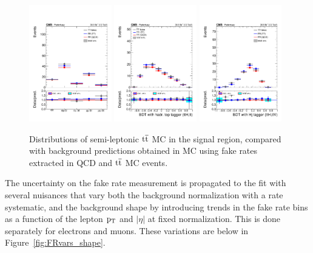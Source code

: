 \begin{figure}[htb]
        \centering 
        \includegraphics[width=0.32\textwidth]{ch10_figs/2lep_catIndex_nosign.pdf}
        \includegraphics[width=0.32\textwidth]{ch10_figs/kinMVA_2lss_ttbar_withBDTv8.pdf}
        \includegraphics[width=0.32\textwidth]{ch10_figs/kinMVA_2lss_ttV_withHj.pdf}
        \caption[MC validation plots of FR method]{Distributions of semi-leptonic $\mathrm{t}\overline{\mathrm{t}}$ MC in the signal region, compared with background predictions obtained
          in MC using fake rates extracted in QCD and $\mathrm{t}\overline{\mathrm{t}}$ MC events.}
        \label{fig:closure}
\end{figure}

\noindent The uncertainty on the fake rate measurement is propagated to the fit with several nuisances that vary both
the background normalization with a rate systematic, and the background shape by introducing trends
in the fake rate bins as a function of the lepton $\mathrm{p}_{\mathrm{T}}$ and $|\eta|$  at fixed normalization.
This is done separately for electrons and muons. These variations are below in Figure~\ref{fig:FRvars_shape}.

